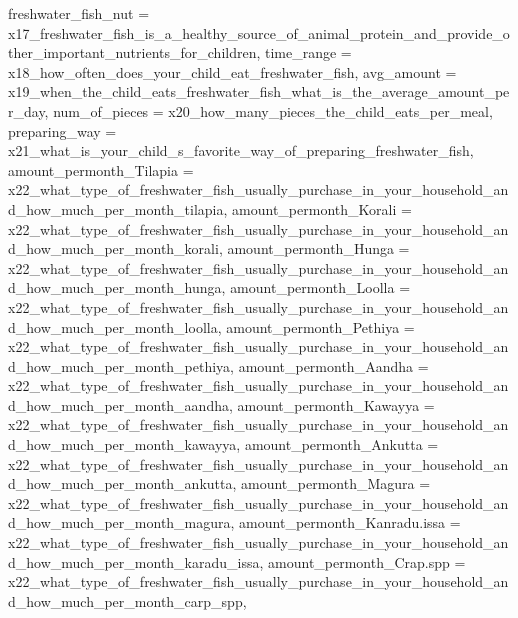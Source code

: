 \documentclass[
]{article}
\newenvironment{Shaded}{\begin{snugshade}}{\end{snugshade}}
\newcommand{\AttributeTok}[1]{\textcolor[rgb]{0.13,0.29,0.53}{#1}}
\newcommand{\NormalTok}[1]{#1}
\begin{document}
\begin{Shaded}
\begin{Highlighting}[]
       \AttributeTok{freshwater\_fish\_nut =}\NormalTok{ x17\_freshwater\_fish\_is\_a\_healthy\_source\_of\_animal\_protein\_and\_provide\_other\_important\_nutrients\_for\_children,}
       \AttributeTok{time\_range =}\NormalTok{  x18\_how\_often\_does\_your\_child\_eat\_freshwater\_fish,}
       \AttributeTok{avg\_amount =}\NormalTok{ x19\_when\_the\_child\_eats\_freshwater\_fish\_what\_is\_the\_average\_amount\_per\_day,}
       \AttributeTok{num\_of\_pieces =}\NormalTok{ x20\_how\_many\_pieces\_the\_child\_eats\_per\_meal,}
       \AttributeTok{preparing\_way =}\NormalTok{ x21\_what\_is\_your\_child\_s\_favorite\_way\_of\_preparing\_freshwater\_fish,}
       \AttributeTok{amount\_permonth\_Tilapia =}\NormalTok{ x22\_what\_type\_of\_freshwater\_fish\_usually\_purchase\_in\_your\_household\_and\_how\_much\_per\_month\_tilapia,}
       \AttributeTok{amount\_permonth\_Korali =}\NormalTok{ x22\_what\_type\_of\_freshwater\_fish\_usually\_purchase\_in\_your\_household\_and\_how\_much\_per\_month\_korali,}
       \AttributeTok{amount\_permonth\_Hunga =}\NormalTok{ x22\_what\_type\_of\_freshwater\_fish\_usually\_purchase\_in\_your\_household\_and\_how\_much\_per\_month\_hunga,}
       \AttributeTok{amount\_permonth\_Loolla =}\NormalTok{ x22\_what\_type\_of\_freshwater\_fish\_usually\_purchase\_in\_your\_household\_and\_how\_much\_per\_month\_loolla,}
       \AttributeTok{amount\_permonth\_Pethiya =}\NormalTok{ x22\_what\_type\_of\_freshwater\_fish\_usually\_purchase\_in\_your\_household\_and\_how\_much\_per\_month\_pethiya,}
       \AttributeTok{amount\_permonth\_Aandha =}\NormalTok{ x22\_what\_type\_of\_freshwater\_fish\_usually\_purchase\_in\_your\_household\_and\_how\_much\_per\_month\_aandha,}
       \AttributeTok{amount\_permonth\_Kawayya =}\NormalTok{ x22\_what\_type\_of\_freshwater\_fish\_usually\_purchase\_in\_your\_household\_and\_how\_much\_per\_month\_kawayya,}
       \AttributeTok{amount\_permonth\_Ankutta =}\NormalTok{ x22\_what\_type\_of\_freshwater\_fish\_usually\_purchase\_in\_your\_household\_and\_how\_much\_per\_month\_ankutta,}
       \AttributeTok{amount\_permonth\_Magura =}\NormalTok{ x22\_what\_type\_of\_freshwater\_fish\_usually\_purchase\_in\_your\_household\_and\_how\_much\_per\_month\_magura,}
       \AttributeTok{amount\_permonth\_Kanradu.issa =}\NormalTok{ x22\_what\_type\_of\_freshwater\_fish\_usually\_purchase\_in\_your\_household\_and\_how\_much\_per\_month\_karadu\_issa,}
       \AttributeTok{amount\_permonth\_Crap.spp =}\NormalTok{ x22\_what\_type\_of\_freshwater\_fish\_usually\_purchase\_in\_your\_household\_and\_how\_much\_per\_month\_carp\_spp,}

\end{Highlighting}
\end{Shaded}
\end{document}
